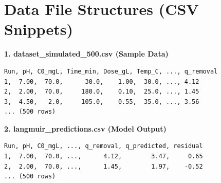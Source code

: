 \section{Data File Structures (CSV Snippets)}

\textbf{1. dataset\_simulated\_500.csv (Sample Data)}
\begin{verbatim}
Run, pH, C0_mgL, Time_min, Dose_gL, Temp_C, ..., q_removal
1,  7.00,  70.0,      30.0,    1.00,  30.0, ..., 4.12
2,  2.00,  70.0,     180.0,    0.10,  25.0, ..., 1.45
3,  4.50,   2.0,     105.0,    0.55,  35.0, ..., 3.56
... (500 rows)
\end{verbatim}

\textbf{2. langmuir\_predictions.csv (Model Output)}
\begin{verbatim}
Run, pH, C0_mgL, ..., q_removal, q_predicted, residual
1,  7.00,  70.0, ...,      4.12,        3.47,     0.65
2,  2.00,  70.0, ...,      1.45,        1.97,    -0.52
... (500 rows)
\end{verbatim}